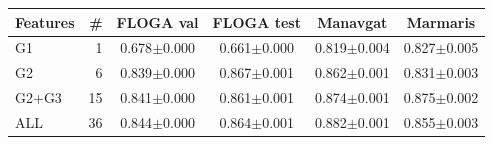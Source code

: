 \begin{tabular}{lrcccc}
\toprule
Features & \# & FLOGA val & FLOGA test & Manavgat & Marmaris \\
\midrule
G1 & 1 & 0.678$\pm$0.000 & 0.661$\pm$0.000 & 0.819$\pm$0.004 & 0.827$\pm$0.005 \\
G2 & 6 & 0.839$\pm$0.000 & 0.867$\pm$0.001 & 0.862$\pm$0.001 & 0.831$\pm$0.003 \\
G2+G3 & 15 & 0.841$\pm$0.000 & 0.861$\pm$0.001 & 0.874$\pm$0.001 & 0.875$\pm$0.002 \\
ALL & 36 & 0.844$\pm$0.000 & 0.864$\pm$0.001 & 0.882$\pm$0.001 & 0.855$\pm$0.003 \\
\bottomrule
\end{tabular}
